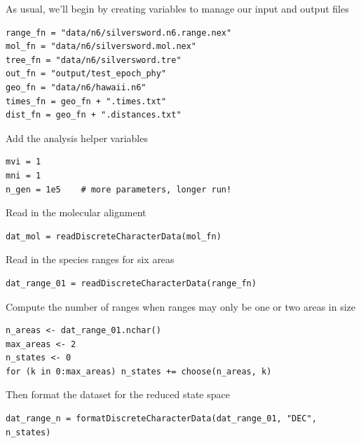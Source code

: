 As usual, we'll begin by creating variables to manage our input and output files

\begin{snugshade}
\begin{lstlisting}
range_fn = "data/n6/silversword.n6.range.nex"
mol_fn = "data/n6/silversword.mol.nex"
tree_fn = "data/n6/silversword.tre"
out_fn = "output/test_epoch_phy"
geo_fn = "data/n6/hawaii.n6"
times_fn = geo_fn + ".times.txt"
dist_fn = geo_fn + ".distances.txt"
\end{lstlisting}
\end{snugshade}

Add the analysis helper variables

\begin{snugshade}
\begin{lstlisting}
mvi = 1
mni = 1
n_gen = 1e5    # more parameters, longer run!
\end{lstlisting}
\end{snugshade}


Read in the molecular alignment

\begin{snugshade}
\begin{lstlisting}
dat_mol = readDiscreteCharacterData(mol_fn)
\end{lstlisting}
\end{snugshade}


Read in the species ranges for six areas

\begin{snugshade}
\begin{lstlisting}
dat_range_01 = readDiscreteCharacterData(range_fn)
\end{lstlisting}
\end{snugshade}

Compute the number of ranges when ranges may only be one or two areas in size

\begin{snugshade}
\begin{lstlisting}
n_areas <- dat_range_01.nchar()
max_areas <- 2
n_states <- 0
for (k in 0:max_areas) n_states += choose(n_areas, k)
\end{lstlisting}
\end{snugshade}

Then format the dataset for the reduced state space

\begin{snugshade}
\begin{lstlisting}
dat_range_n = formatDiscreteCharacterData(dat_range_01, "DEC", n_states)
\end{lstlisting}
\end{snugshade}

